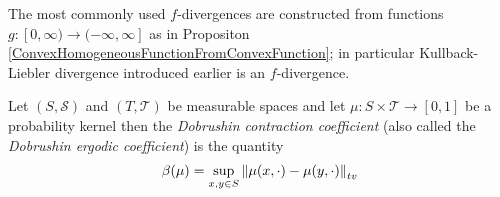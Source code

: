The most commonly used $f$-divergences are constructed from functions $g : [0,\infty) \to (-\infty, \infty]$ as in Propositon \ref{ConvexHomogeneousFunctionFromConvexFunction}; in particular Kullback-Liebler divergence introduced earlier is an $f$-divergence.

\begin{defn}Let $(S, \mathcal{S})$ and $(T, \mathcal{T})$ be measurable spaces and let $\mu : S
\times \mathcal{T} \to [0,1]$ be a probability kernel then the \emph{Dobrushin contraction coefficient} (also called the \emph{Dobrushin ergodic coefficient}) is the quantity
\begin{align*}
\beta(\mu) = \sup_{x,y \in S} \left \lVert  \mu(x, \cdot) - \mu(y, \cdot) \right \rVert_{tv}
\end{align*}
\end{defn}

